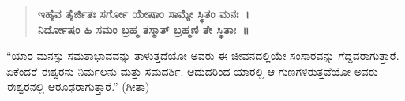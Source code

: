 \begin{verse}
\textbf{ಇಹೈವ ತೈರ್ಜಿತಃ ಸರ್ಗೋ ಯೇಷಾಂ ಸಾಮ್ಯೇ ಸ್ಥಿತಂ ಮನಃ~।}\\\textbf{ನಿರ್ದೋಷಂ ಹಿ ಸಮಂ ಬ್ರಹ್ಮ ತಸ್ಮಾತ್​ ಬ್ರಹ್ಮಣಿ ತೇ ಸ್ಥಿತಾಃ~॥}
\end{verse}

“ಯಾರ ಮನಸ್ಸು ಸಮತಾಭಾವವನ್ನು ತಾಳುತ್ತದೆಯೋ ಅವರು ಈ ಜೀವನದಲ್ಲಿಯೇ ಸಂಸಾರವನ್ನು ಗೆದ್ದವರಾಗುತ್ತಾರೆ. ಏಕೆಂದರೆ ಈಶ್ವರನು ನಿರ್ಮಲನು ಮತ್ತು ಸಮದರ್ಶಿ. ಆದುದರಿಂದ ಯಾರಲ್ಲಿ ಆ ಗುಣಗಳಿರುತ್ತವೆಯೋ ಅವರು ಈಶ್ವರನಲ್ಲಿ ಆರೂಢರಾಗುತ್ತಾರೆ.” (ಗೀತಾ)

